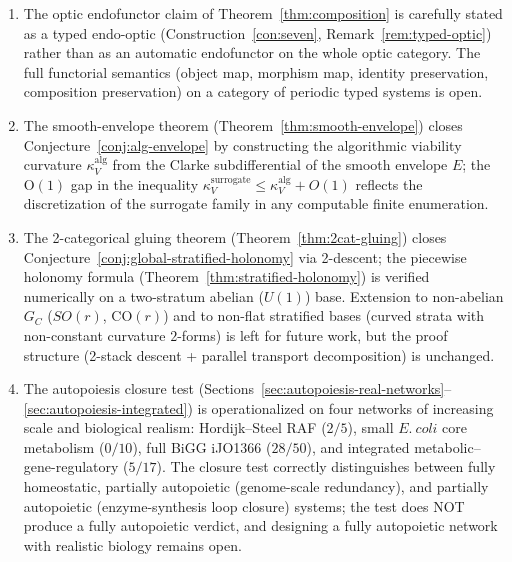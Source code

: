 \documentclass[11pt,a4paper]{article}
\theoremstyle{plain}
\theoremstyle{definition}
\theoremstyle{remark}
\newcommand{\kk}{\kappa_{\!V}}
\newcommand{\CO}{\mathrm{CO}}
\begin{document}
\begin{enumerate}[leftmargin=*,itemsep=2pt]
decomposition~\eqref{eq:Hraw} is derived from a Lévy $\alpha$-stable
first-passage model in Section~\ref{sec:levy-3half}
(Theorem~\ref{thm:levy-3half}, closing
Conjecture~\ref{conj:heavytail-3half}); the heavy-tail stress test of
Section~\ref{sec:stress} supports the exponent empirically across the
Student--$t$ tail-parameter axis.
\item The optic endofunctor claim of Theorem~\ref{thm:composition} is
carefully stated as a typed endo-optic (Construction~\ref{con:seven},
Remark~\ref{rem:typed-optic}) rather than as an automatic
endofunctor on the whole optic category. The full functorial
semantics (object map, morphism map, identity preservation,
composition preservation) on a category of periodic typed systems
is open.
\item The smooth-envelope theorem (Theorem~\ref{thm:smooth-envelope})
closes Conjecture~\ref{conj:alg-envelope} by constructing the
algorithmic viability curvature $\kk^{\mathrm{alg}}$ from the Clarke
subdifferential of the smooth envelope $E$; the O$(1)$ gap in the
inequality $\kk^{\mathrm{surrogate}} \leq \kk^{\mathrm{alg}} + O(1)$
reflects the discretization of the surrogate family in any computable
finite enumeration.
\item The 2-categorical gluing theorem (Theorem~\ref{thm:2cat-gluing})
closes Conjecture~\ref{conj:global-stratified-holonomy} via
2-descent; the piecewise holonomy formula
(Theorem~\ref{thm:stratified-holonomy}) is verified numerically on a
two-stratum abelian ($U(1)$) base. Extension to non-abelian $G_C$
($SO(r)$, $\CO(r)$) and to non-flat stratified bases (curved strata
with non-constant curvature $2$-forms) is left for future work, but
the proof structure (2-stack descent + parallel transport
decomposition) is unchanged.
\item The autopoiesis closure test
(Sections~\ref{sec:autopoiesis-real-networks}--\ref{sec:autopoiesis-integrated})
is operationalized on four networks of increasing scale and biological
realism: Hordijk--Steel RAF ($2/5$), small $E.~coli$ core metabolism
($0/10$), full BiGG iJO1366 ($28/50$), and integrated
metabolic--gene-regulatory ($5/17$). The closure test correctly
distinguishes between fully homeostatic, partially autopoietic
(genome-scale redundancy), and partially autopoietic
(enzyme-synthesis loop closure) systems; the test does NOT produce
a fully autopoietic verdict, and designing a fully autopoietic
network with realistic biology remains open.
\end{enumerate}
\end{document}
